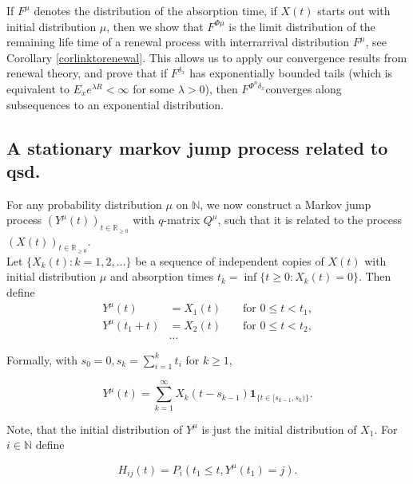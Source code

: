 \documentclass[12pt,a4paper]{scrartcl}
\numberwithin{equation}{section}
\newcommand{\R}{\mathbb{R}} %
\newcommand{\N}{\mathbb{N}} %
\begin{document}
\begin{enumerate}
If $F^{\mu}$ denotes the distribution of the absorption time, if $X\left(t\right)$ starts out with initial distribution $\mu$, then we show that $F^{\Phi\mu}$ is the limit distribution of the remaining life time of a renewal process with interrarrival distribution $F^{\mu}$, see Corollary \ref{corlinktorenewal}. This allows us to apply our convergence results from renewal theory, and prove that if $F^{\delta_x}$ has exponentially bounded tails (which is equivalent to $E_x e^{\lambda R} < \infty$ for some $\lambda > 0$), then $F^{\Phi^n\delta_x}$converges along subsequences to an exponential distribution. 

\end{enumerate}

\subsection{A stationary markov jump process related to qsd.} \label{sq:constructionofymu}
For any probability distribution $\mu$ on $\N$, we now construct a Markov jump process $\left(Y^{\mu}\left(t\right)\right)_{t \in \R_{\geq 0}}$ with $q$-matrix $Q^{\mu}$, such that it is related to the process $\left(X\left(t\right)\right)_{t \in \R_{\geq 0}}$. \\[2ex]

Let $\lbrace X_k\left(t\right) : k=1,2,\ldots \rbrace  $ be a sequence of independent copies of $ X\left(t\right) $ with initial distribution $\mu$ and absorption times $ t_k = \inf\lbrace t \geq 0 : X_k\left(t\right) = 0 \rbrace .$  Then define
\begin{align*}
Y^{\mu}\left(t\right) &= X_1\left(t\right) &&\text{ for } 0 \leq t < t_1, \\
Y^{\mu}\left(t_1 + t \right) &= X_2\left(t\right) &&\text{ for } 0 \leq t < t_2, \\
&\ldots
\end{align*}

Formally, with $s_0 = 0, s_k = \sum_{i=1}^k t_i$ for $k\geq 1$,

\begin{equation} \label{eq:ymu}
Y^{\mu}\left(t\right) = \sum_{k=1}^{\infty} X_k\left(t-s_{k-1}\right) \textbf{1}_{\lbrace t \in [s_{k-1}, s_k)\rbrace }.
\end{equation}

Note, that the initial distribution of $Y^{\mu}$ is just the initial distribution of $X_1$.
For $ i \in \N$ define

$$ H_{ij}\left(t\right) = P_i\left(t_1 \leq t, Y^{\mu}\left(t_1\right) = j\right). $$
\end{document}
